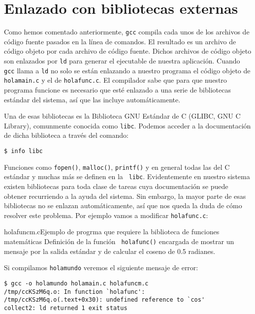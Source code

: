 \section{Enlazado con bibliotecas externas}

Como hemos comentado anteriormente, {\tt gcc} compila cada unos de los
archivos de código fuente pasados en la línea de comandos. El resultado
es un archivo de código objeto por cada archivo de código fuente. Dichos
archivos de código objeto son enlazados por {\tt ld} para generar el
ejecutable de nuestra aplicación. Cuando {\tt gcc} llama a {\tt ld} no
solo se están enlazando a nuestro programa el código objeto de {\tt
holamain.c} y el de {\tt holafunc.c}. El compilador sabe que para que
nuestro programa funcione es necesario que esté enlazado a una serie de
bibliotecas estándar del sistema, así que las incluye automáticamente.

Una de esas bibliotecas es la {\sf Biblioteca GNU Estándar de C (GLIBC,
GNU C Library)}, comunmente conocida como {\tt libc}.
Podemos acceder a la documentación de dicha biblioteca a través del
comando:

\begin{verbatim}
$ info libc
\end{verbatim}

Funciones como {\tt fopen()}, {\tt malloc()}, {\tt printf()} y en
general todas las del C estándar y muchas más se definen en la {\tt
libc}. Evidentemente en nuestro sistema existen bibliotecas para toda
clase de tareas cuya documentación se puede obtener recurriendo a la
ayuda del sistema. Sin embargo, la mayor parte de esas bibliotecas no se
enlazan automáticamente, así que nos queda la duda de cómo resolver este
problema. Por ejemplo vamos a modificar {\tt holafunc.c}:

\begin{ejemplo}{holafuncm.c}{Ejemplo de progrma que requiere la
biblioteca de funciones matemáticas} Definición de la función {\tt
holafunc()} encargada de mostrar un mensaje por la salida estándar y de
calcular el coseno de 0.5 radianes. \end{ejemplo}

Si compilamos {\tt holamundo} veremos el siguiente mensaje de error:

\begin{verbatim}
$ gcc -o holamundo holamain.c holafuncm.c
/tmp/ccKSzM6q.o: In function `holafunc':
/tmp/ccKSzM6q.o(.text+0x30): undefined reference to `cos'
collect2: ld returned 1 exit status
\end{verbatim}

